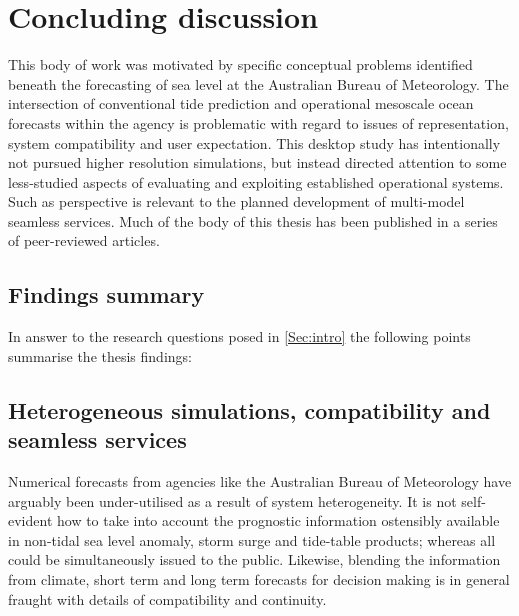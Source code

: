 
\chapter{Concluding discussion}\label{c:conclusions}

This body of work was motivated by specific conceptual problems identified beneath the forecasting of sea level at the Australian Bureau of Meteorology.  The intersection of conventional tide prediction and operational mesoscale ocean forecasts within the agency is problematic with regard to issues of representation, system compatibility and user expectation.
This desktop study has intentionally not pursued higher resolution simulations, but instead directed attention to some less-studied aspects of evaluating and exploiting established operational systems.   Such as perspective is relevant to the planned development of multi-model seamless services.   
Much of the body of this thesis has been published in a series of peer-reviewed articles.
\section{Findings summary}
In answer to the research questions posed in \ref{Sec:intro} the following points summarise the thesis findings:


\section{Heterogeneous simulations, compatibility and seamless services}

Numerical forecasts from agencies like the Australian Bureau of Meteorology have arguably been under-utilised as a result of system heterogeneity.   It is not self-evident how to take into account the prognostic information ostensibly available in non-tidal sea level anomaly, storm surge and tide-table products; whereas all could be simultaneously issued to the public. 
Likewise, blending the information from climate, short term and long term forecasts for decision making is in general fraught with details of compatibility and continuity.

